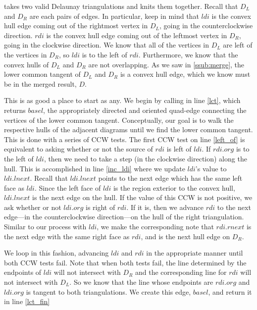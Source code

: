 \documentclass[12pt,twoside]{reedthesis}
\begin{document}
     takes two valid Delaunay triangulations and knits them together. Recall that $D_{L}$ and $D_{R}$ are each pairs of edges. In particular, keep in mind that $ldi$ is the convex hull edge coming out of the rightmost vertex in $D_{L}$, going in the counterclockwise direction. $rdi$ is the convex hull edge coming out of the leftmost vertex in $D_{R}$, going in the clockwise direction. We know that all of the vertices in $D_{L}$ are left of the vertices in $D_{R}$, so $ldi$ is to the left of $rdi$. Furthermore, we know that the convex hulls of $D_{L}$ and $D_{R}$ are not overlapping. As we saw in \cref{ssub:merge}, the lower common tangent of $D_{L}$ and $D_{R}$ is a convex hull edge, which we know must be in the merged result, $D$. \par

    This is as good a place to start as any. We begin by calling  in line \ref{lct}, which returns $basel$, the appropriately directed and oriented quad-edge connecting the vertices of the lower common tangent. Conceptually, our goal is to walk the respective hulls of the adjacent diagrams until we find the lower common tangent. This is done with a series of \textsc{CCW} tests. The first \textsc{CCW} test on line \ref{left_of} is equivalent to asking whether or not the source of $rdi$ is left of $ldi$. If $rdi.org$ is to the left of $ldi$, then we need to take a step (in the clockwise direction) along the hull. This is accomplished in line \ref{inc_ldi} where we update $ldi$'s value to $ldi.lnext$. Recall that $ldi.lnext$ points to the next edge which has the same left face as $ldi$. Since the left face of $ldi$ is the region exterior to the convex hull, $ldi.lnext$ is the next edge on the hull. If the value of this \textsc{CCW} is not positive, we ask whether or not $ldi.org$ is right of $rdi$. If it is, then we advance $rdi$ to the next edge---in the counterclockwise direction---on the hull of the right triangulation. Similar to our process with $ldi$, we make the corresponding note that $rdi.rnext$ is the next edge with the same right face as $rdi$, and is the next hull edge on $D_{R}$.\par

    We loop in this fashion, advancing $ldi$ and $rdi$ in the appropriate manner until both \textsc{CCW} tests fail. Note that when both tests fail, the line determined by the endpoints of $ldi$ will not intersect with $D_{R}$ and the corresponding line for $rdi$ will not intersect with $D_{L}$. So we know that the line whose endpoints are $rdi.org$ and $ldi.org$ is tangent to both triangulations. We create this edge, $basel$, and return it in line \ref{lct_fin}\par
\end{document}
